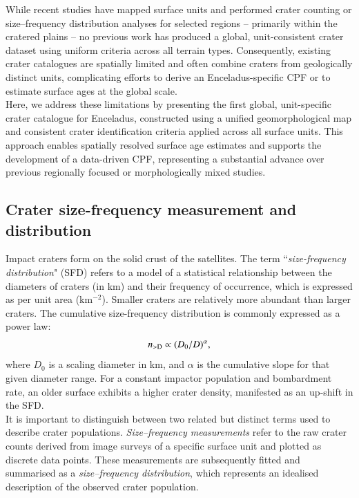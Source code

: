 \documentclass[preprint,11pt,3p,times,authoryear]{elsarticle}
\begin{document}
While recent studies have mapped surface units and performed crater counting or size–frequency distribution analyses for selected regions -- primarily within the cratered plains -- no previous work has produced a global, unit-consistent crater dataset using uniform criteria across all terrain types. Consequently, existing crater catalogues are spatially limited and often combine craters from geologically distinct units, complicating efforts to derive an Enceladus-specific CPF or to estimate surface ages at the global scale.\\

Here, we address these limitations by presenting the first global, unit-specific crater catalogue for Enceladus, constructed using a unified geomorphological map and consistent crater identification criteria applied across all surface units. This approach enables spatially resolved surface age estimates and supports the development of a data-driven CPF, representing a substantial advance over previous regionally focused or morphologically mixed studies.

\subsection{Crater size-frequency measurement and distribution}
\label{subsec:sfd}
Impact craters form on the solid crust of the satellites. The term ``{\it size-frequency distribution}" (SFD) refers to a model of a statistical relationship between the diameters of craters (in km) and their frequency of occurrence, which is expressed as per unit area (km$^{-2}$). Smaller craters are relatively more abundant than larger craters. 
The cumulative size-frequency distribution is commonly expressed as a power law:
\begin{equation}
  n_{\rm >D} \propto (D_0/D)^\alpha, %
  \label{eq:sfd}
\end{equation}
where $D_0$ is a scaling diameter in km, and $\alpha$ is the cumulative slope for that given diameter range. For a constant impactor population and bombardment rate, an older surface exhibits a higher crater density, manifested as an up-shift in the SFD. \\

It is important to distinguish between two related but distinct terms used to describe crater populations. \textit{Size–frequency measurements} refer to the raw crater counts derived from image surveys of a specific surface unit and plotted as discrete data points. These measurements are subsequently fitted and summarised as a \textit{size–frequency distribution}, which represents an idealised description of the observed crater population. \\
\end{document}
